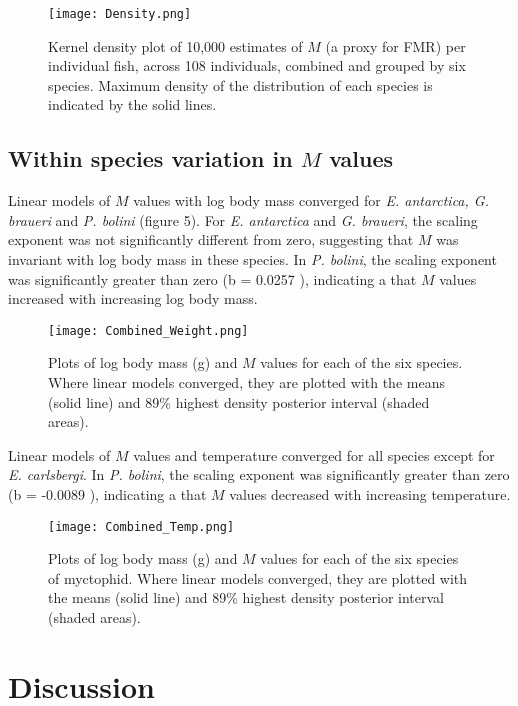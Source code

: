 \documentclass[12pt, titlepage]{article}
\begin{document}
\begin{figure}[H]
\texttt{[image: Density.png]}
\caption{Kernel density plot of 10,000 estimates of $M$ (a proxy for FMR) per individual fish, across 108 individuals, combined and grouped by six species. Maximum density of the distribution of each species is indicated by the solid lines.}
\end{figure}

\pagebreak
\subsection{Within species variation in $M$ values}

Linear models of $M$ values with log body mass converged for \textit{E. antarctica, G. braueri} and \textit{P. bolini} (figure 5).
For \textit{E. antarctica} and \textit{G. braueri}, the scaling exponent was not significantly different from zero, suggesting that $M$ was invariant with log body mass in these species.
In \textit{P. bolini}, the scaling exponent was significantly greater than zero (b = 0.0257 ), indicating a that $M$ values increased with increasing log body mass.

\begin{figure}[H]
\texttt{[image: Combined\_Weight.png]}
\caption{Plots of log body mass (g) and $M$ values for each of the six species. Where linear models converged, they are plotted with the means (solid line) and 89\% highest density posterior interval (shaded areas).}
\end{figure}

Linear models of $M$ values and temperature converged for all species except for \textit{E. carlsbergi}.
In \textit{P. bolini}, the scaling exponent was significantly greater than zero (b = -0.0089 ), indicating a that $M$ values decreased with increasing temperature.

\begin{figure}[H]
\texttt{[image: Combined\_Temp.png]}
\caption{Plots of log body mass (g) and $M$ values for each of the six species of myctophid. Where linear models converged, they are plotted with the means (solid line) and 89\% highest density posterior interval (shaded areas).}
\end{figure}

\pagebreak
\section{Discussion}
\end{document}
